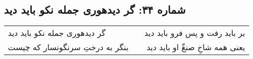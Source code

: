\begin{center}
\section*{شماره ۳۴: گر دیدهوری جمله نکو باید دید}
\label{sec:034}
\begin{longtable}{l p{0.5cm} r}
گر دیدهوری جمله نکو باید دید
&&
بر باید رفت و پس فرو باید دید
\\
بنگر به درختِ سرنگونسار که چیست
&&
یعنی همه شاخِ صنعِّ او باید دید
\\
\end{longtable}
\end{center}
